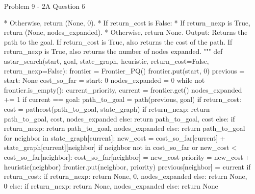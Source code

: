 \begin{problem}{Problem 9 - 2A Question 6}
\begin{highlight}[Solution]
\begin{code}[Python]
                    * Otherwise, return (None, 0).
                * If return_cost is False:
                    * If return_nexp is True, return (None, nodes_expanded).
                    * Otherwise, return None.
        Output:
            Returns the path to the goal.
            If return_cost is True, also returns the cost of the path.
            If return_nexp is True, also returns the number of nodes expanded.
    """
    def astar_search(start, goal, state_graph, heuristic, return_cost=False, return_nexp=False):
        frontier = Frontier_PQ()
        frontier.put(start, 0)
        previous = {start: None}
        cost_so_far = {start: 0}
        nodes_expanded = 0
        while not frontier.is_empty():
            current_priority, current = frontier.get()
            nodes_expanded += 1
            if current == goal:
                path_to_goal = path(previous, goal)
                if return_cost:
                    cost = pathcost(path_to_goal, state_graph)
                    if return_nexp:
                        return path_to_goal, cost, nodes_expanded
                    else:
                        return path_to_goal, cost
                else:
                    if return_nexp:
                        return path_to_goal, nodes_expanded
                    else:
                        return path_to_goal
            for neighbor in state_graph[current]:
                new_cost = cost_so_far[current] + state_graph[current][neighbor]
                if neighbor not in cost_so_far or new_cost < cost_so_far[neighbor]:
                    cost_so_far[neighbor] = new_cost
                    priority = new_cost + heuristic(neighbor)
                    frontier.put(neighbor, priority)
                    previous[neighbor] = current
        if return_cost:
            if return_nexp:
                return None, 0, nodes_expanded
            else:
                return None, 0
        else:
            if return_nexp:
                return None, nodes_expanded
            else:
                return None
        

\end{code}
\end{highlight}
\end{problem}
